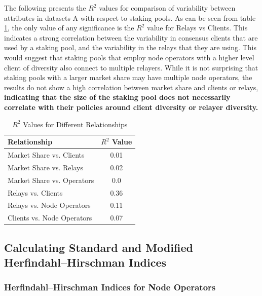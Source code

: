 \documentclass[conference]{IEEEtran}
\begin{document}
The following presents the $R^2$ values for comparison of variability between attributes in datasets A with respect to staking pools.  As can be seen from table \ref{tab:r2-value-staking-pools}, the only value of any significance is the $R^2$ value for Relays vs Clients.  This indicates a strong correlation between the variability in consensus clients that are used by a staking pool, and the variability in the relays that they are using.  This would suggest that staking pools that employ node operators with a higher level client of diversity also connect to multiple relayers.  While it is not surprising that staking pools with a larger market share may have multiple node operators, the results do not show a high correlation between market share and clients or relays, \textbf{indicating that the size of the staking pool does not necessarily correlate with their policies around client diversity or relayer diversity.}

\begin{table}[htbp]
    \centering
    \normalsize
    \renewcommand{\arraystretch}{1.2}
    \begin{tabular}{|p{6cm}|c|}
        \hline
        \textbf{Relationship} & \textbf{$R^2$ Value} \\
        \hline
        Market Share vs. Clients & 0.01 \\ \hline
        Market Share vs. Relays & 0.02 \\ \hline
        Market Share vs. Operators & 0.0 \\ \hline
        Relays vs. Clients & 0.36 \\ \hline
        Relays vs. Node Operators & 0.11 \\ \hline
        Clients vs. Node Operators & 0.07 \\ \hline
    \end{tabular}
    \vspace{10pt}
    \caption{$R^2$ Values for Different Relationships}
    \label{tab:r2-value-staking-pools}
\end{table}

\subsection{Calculating Standard and Modified Herfindahl–Hirschman Indices}

\subsubsection{Herfindahl–Hirschman Indices for Node Operators}
\end{document}
